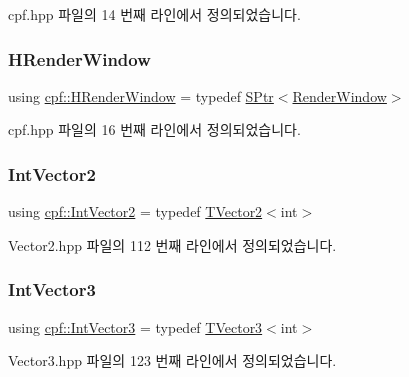 cpf.\+hpp 파일의 14 번째 라인에서 정의되었습니다.

\mbox{\label{namespacecpf_af5ffcc39bb6465427fc3b91366c917f6}} 
\subsubsection{\texorpdfstring{H\+Render\+Window}{HRenderWindow}}
{\footnotesize\ttfamily using \hyperlink{namespacecpf_af5ffcc39bb6465427fc3b91366c917f6}{cpf\+::\+H\+Render\+Window} = typedef \hyperlink{namespacecpf_a91e72db639307e12a24546a0eebb1a42}{S\+Ptr}$<$\hyperlink{classcpf_1_1_render_window}{Render\+Window}$>$}



cpf.\+hpp 파일의 16 번째 라인에서 정의되었습니다.

\mbox{\label{namespacecpf_a2f1e39acef158fd0946044e6ea9547fe}} 
\subsubsection{\texorpdfstring{Int\+Vector2}{IntVector2}}
{\footnotesize\ttfamily using \hyperlink{namespacecpf_a2f1e39acef158fd0946044e6ea9547fe}{cpf\+::\+Int\+Vector2} = typedef \hyperlink{classcpf_1_1_t_vector2}{T\+Vector2}$<$int$>$}



Vector2.\+hpp 파일의 112 번째 라인에서 정의되었습니다.

\mbox{\label{namespacecpf_a4308e51999664b7c52e0a33d6e6af1a6}} 
\subsubsection{\texorpdfstring{Int\+Vector3}{IntVector3}}
{\footnotesize\ttfamily using \hyperlink{namespacecpf_a4308e51999664b7c52e0a33d6e6af1a6}{cpf\+::\+Int\+Vector3} = typedef \hyperlink{classcpf_1_1_t_vector3}{T\+Vector3}$<$int$>$}



Vector3.\+hpp 파일의 123 번째 라인에서 정의되었습니다.

\mbox{\label{namespacecpf_a91e72db639307e12a24546a0eebb1a42}} 
